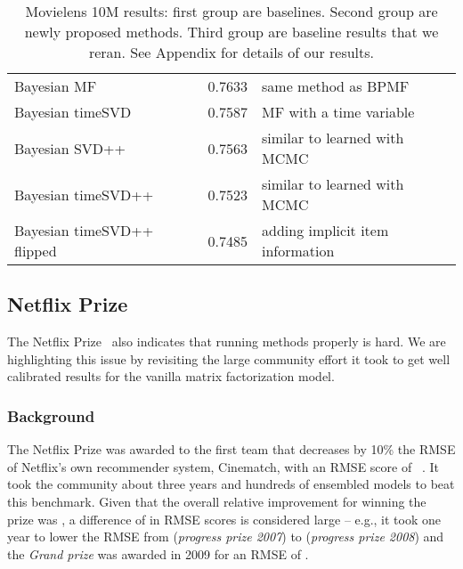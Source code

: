 \documentclass{article}
\newcommand\rmsebfmui{0.7633}
\newcommand\rmsebfmuit{0.7587}
\newcommand\rmsebfmuiui{0.7563}
\newcommand\rmsebfmuitui{0.7523}
\newcommand\rmsebfmuituiiu{0.7485}
\begin{document}
\begin{table}[h]
\begin{tabular}{lSl}
Bayesian MF~\cite{salakhutdinov:icml08,freudenthaler:nipsws11} & \rmsebfmui & same method as BPMF\\
Bayesian timeSVD~\cite{koren:kdd09,freudenthaler:nipsws11,rendle:vldb13} & \rmsebfmuit & MF with a time variable \\
Bayesian SVD++~\cite{koren:kdd08,rendle:vldb13} & \rmsebfmuiui & similar to \cite{koren:kdd08} learned with MCMC\\
Bayesian timeSVD++~\cite{koren:kdd09,rendle:vldb13} & \rmsebfmuitui & similar to \cite{koren:kdd09} learned with MCMC \\
Bayesian timeSVD++ flipped~\cite{rendle:vldb13} & \rmsebfmuituiiu & adding implicit item information \\
\bottomrule
\end{tabular}
    \caption{Movielens 10M results: first group are baselines. Second group are newly proposed methods. Third group are baseline results that we reran. See Appendix for details of our results.
    \label{tbl:ml10m}}
\end{table}

\pagebreak[4]


\subsection{Netflix Prize}
\label{sec:netflix}

The Netflix Prize~\cite{bennett:kddcup07} also indicates that running methods properly is hard.
We are highlighting this issue by revisiting the large community effort it took to get well calibrated results for the vanilla matrix factorization model.

\subsubsection{Background}


The Netflix Prize was awarded to the first team that decreases by 10\% the RMSE of Netflix's own recommender system, Cinematch, with an RMSE score of ~\cite{bennett:kddcup07}.
It took the community about three years and hundreds of ensembled models to beat this benchmark.
Given that the overall relative improvement for winning the prize was , a difference of  in RMSE scores is considered large -- e.g., it took one year to lower the RMSE from  (\emph{progress prize 2007}) to  (\emph{progress prize 2008}) and the \emph{Grand prize} was awarded in 2009 for an RMSE of .
\end{document}
